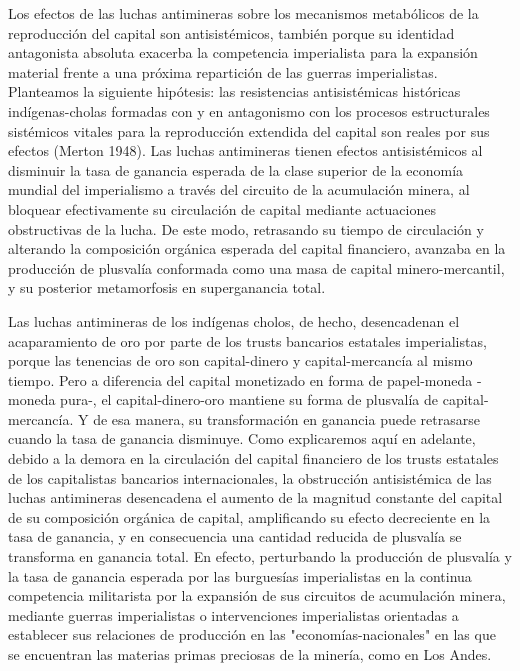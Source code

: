 \documentclass[]{interact}
\theoremstyle{plain}%
\theoremstyle{definition}
\theoremstyle{remark}
\begin{document}
Los efectos de las luchas antimineras sobre los mecanismos metabólicos de la reproducción del capital son antisistémicos, también porque su identidad antagonista absoluta exacerba la competencia imperialista para la expansión material frente a una próxima repartición de las guerras imperialistas. Planteamos la siguiente hipótesis: las resistencias antisistémicas históricas indígenas-cholas formadas con y en antagonismo con los procesos estructurales sistémicos vitales para la reproducción extendida del capital son reales por sus efectos (Merton 1948). Las luchas antimineras tienen efectos antisistémicos al disminuir la tasa de ganancia esperada de la clase superior de la economía mundial del imperialismo a través del circuito de la acumulación minera, al bloquear efectivamente su circulación de capital mediante actuaciones obstructivas de la lucha. De este modo, retrasando su tiempo de circulación y alterando la composición orgánica esperada del capital financiero, avanzaba en la producción de plusvalía conformada como una masa de capital minero-mercantil, y su posterior metamorfosis en superganancia total. 

Las luchas antimineras de los indígenas cholos, de hecho, desencadenan el acaparamiento de oro por parte de los trusts bancarios estatales imperialistas, porque las tenencias de oro son capital-dinero y capital-mercancía al mismo tiempo. Pero a diferencia del capital monetizado en forma de papel-moneda -moneda pura-, el capital-dinero-oro mantiene su forma de plusvalía de capital-mercancía. Y de esa manera, su transformación en ganancia puede retrasarse cuando la tasa de ganancia disminuye. Como explicaremos aquí en adelante, debido a la demora en la circulación del capital financiero de los trusts estatales de los capitalistas bancarios internacionales, la obstrucción antisistémica de las luchas antimineras desencadena el aumento de la magnitud constante del capital de su composición orgánica de capital, amplificando su efecto decreciente en la tasa de ganancia, y en consecuencia una cantidad reducida de plusvalía se transforma en ganancia total. En efecto, perturbando la producción de plusvalía y la tasa de ganancia esperada por las burguesías imperialistas en la continua competencia militarista por la expansión de sus circuitos de acumulación minera, mediante guerras imperialistas o intervenciones imperialistas orientadas a establecer sus relaciones de producción en las "economías-nacionales" en las que se encuentran las materias primas preciosas de la minería, como en Los Andes.
\end{document}
